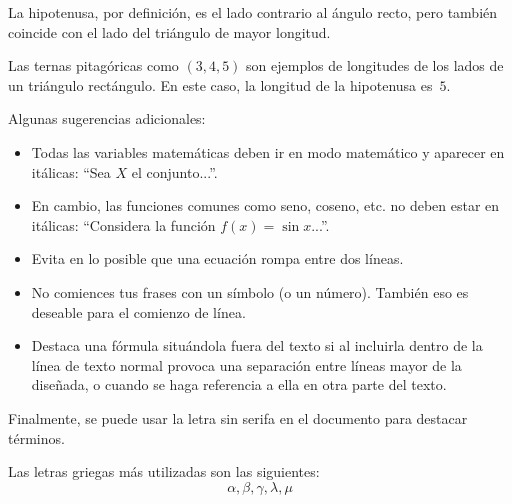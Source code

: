 \begin{rmk}
    La hipotenusa, por definición, es el lado contrario al ángulo recto, pero también coincide con el lado del triángulo de mayor longitud.
\end{rmk}

\begin{exm}
    Las ternas pitagóricas como $(3,4,5)$ son ejemplos de longitudes de los lados de un triángulo rectángulo. En este caso, la longitud de la hipotenusa es~$5$.
\end{exm}

Algunas sugerencias adicionales:
\begin{itemize}
    \item Todas las variables matemáticas deben ir en modo matemático y aparecer en itálicas: ``Sea $X$ el conjunto...''.
    \item En cambio, las funciones comunes como seno, coseno, etc. no deben estar en itálicas: ``Considera la función $f(x)=\sin x$...''.
    \item Evita en lo posible que una ecuación rompa entre dos líneas.
    \item No comiences tus frases con un símbolo (o un número). También eso es deseable para el comienzo de línea.
    \item Destaca una fórmula situándola fuera del texto si al incluirla dentro de la línea de texto normal provoca una separación entre líneas mayor de la diseñada, o cuando se haga referencia a ella en otra parte del texto.
\end{itemize}

Finalmente, se puede usar la letra {\sffamily sin serifa} en el documento para destacar términos.

Las letras griegas más utilizadas son las siguientes:
\[
\alpha,\beta,\gamma,\lambda,\mu
\]